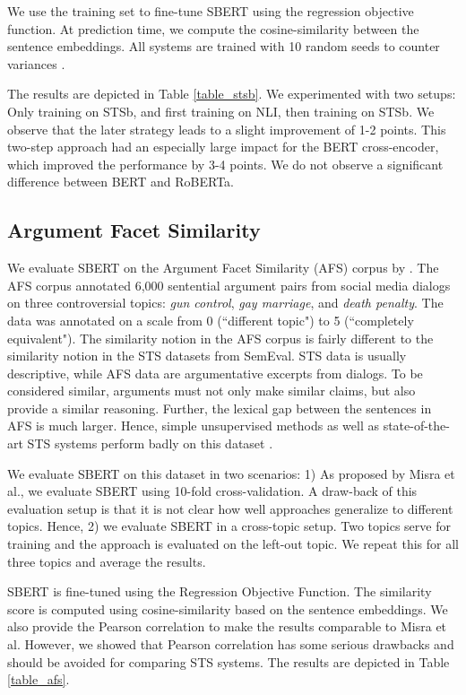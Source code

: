 \documentclass[11pt,a4paper]{article}
\begin{document}
We use the training set to fine-tune SBERT using the regression objective function. At prediction time, we compute the cosine-similarity between the sentence embeddings. All systems are trained with 10 random seeds to counter variances \cite{reimers_single_perf_score}.

The results are depicted in Table \ref{table_stsb}. We experimented with two setups: Only training on STSb, and first training on NLI, then training on STSb. We observe that the later strategy leads to a slight improvement of 1-2 points. This two-step approach had an especially large impact for the BERT cross-encoder, which improved the performance by 3-4 points. We do not observe a significant difference between BERT and RoBERTa.



\subsection{Argument Facet Similarity}
We evaluate SBERT on the Argument Facet Similarity (AFS) corpus by . The AFS corpus annotated 6,000 sentential argument pairs from social media dialogs on three controversial topics: \textit{gun control}, \textit{gay marriage}, and \textit{death penalty}. The data was annotated on a scale from 0 (``different topic") to 5 (``completely equivalent"). The similarity notion in the AFS corpus is fairly different to the similarity notion in the STS datasets from SemEval. STS data is usually descriptive, while AFS data are argumentative excerpts from dialogs. To be considered similar, arguments must not only make similar claims, but also provide a similar reasoning. Further, the lexical gap between the sentences in AFS is much larger. Hence, simple unsupervised methods as well as state-of-the-art STS systems perform badly on this dataset \cite{reimers-etal-2019-classification}.

We evaluate SBERT on this dataset in two scenarios: 1) As proposed by Misra et al., we evaluate SBERT using 10-fold cross-validation. A draw-back of this evaluation setup is that it is not clear how well approaches generalize to different topics. Hence, 2) we evaluate SBERT in a cross-topic setup. Two topics serve for training and the approach is evaluated on the left-out topic. We repeat this for all three topics and average the results.

SBERT is fine-tuned using the Regression Objective Function. The similarity score is computed using cosine-similarity based on the sentence embeddings. We also provide the Pearson correlation  to make the results comparable to Misra et al. However, we showed \cite{Reimers2016_STS} that Pearson correlation has some serious drawbacks and should be avoided for comparing STS systems. The results are depicted in Table \ref{table_afs}. 
\end{document}
